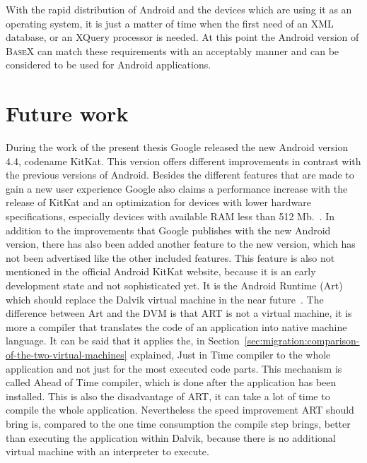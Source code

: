 



With the rapid distribution of Android and the devices which are using it as an operating system, it is just a matter of time when the first need of an XML database, or an XQuery processor is needed.
At this point the Android version of \textsc{BaseX} can match these requirements with an acceptably manner and can be considered to be used for Android applications.




\section{Future work}
\label{sec:summery:future-work}
During the work of the present thesis Google released the new Android version 4.4, codename KitKat.
This version offers different improvements in contrast with the previous versions of Android.
Besides the different features that are made to gain a new user experience Google also claims a performance increase with the release of KitKat and an optimization for devices with lower hardware specifications, especially devices with available RAM less than 512 Mb.~\cite{google-kitkat}.
In addition to the improvements that Google publishes with the new Android version, there has also been added another feature to the new version, which has not been advertised like the other included features.
This feature is also not mentioned in the official Android KitKat website, because it is an early development state and not sophisticated yet.
It is the Android Runtime (Art) which should replace the Dalvik virtual machine in the near future~\cite{android-art}.
The difference between Art and the DVM is that ART is not a virtual machine, it is more a compiler that translates the code of an application into native machine language.
It can be said that it applies the, in Section~\ref{sec:migration:comparison-of-the-two-virtual-machines} explained, Just in Time compiler to the whole application and not just for the most executed code parts.
This mechanism is called Ahead of Time compiler, which is done after the application has been installed.
This is also the disadvantage of ART, it can take a lot of time to compile the whole application.
Nevertheless the speed improvement ART should bring is, compared to the one time consumption the compile step brings, better than executing the application within Dalvik, because there is no additional virtual machine with an interpreter to execute.
